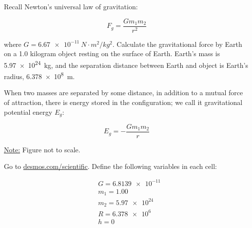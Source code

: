 \documentclass[../main-physics-problems.tex]{subfiles}
\begin{document}
\begin{questions}
\question
Recall Newton's universal law of gravitation:

\begin{equation*}
    F_g = \frac{G m_1 m_2}{r^2}
\end{equation*}

where $G = \SI{6.67e-11}{N\cdot m^2/kg^2}$. Calculate the gravitational force by Earth on a 1.0 kilogram object resting on the surface of Earth. Earth's mass is \SI{5.97e24}{kg}, and the separation distance between Earth and object is Earth's radius, \SI{6.378e8}{m}.

\question
When two masses are separated by some distance, in addition to a mutual force of attraction, there is energy stored in the configuration; we call it gravitational potential energy $E_g$:

\bigskip

\begin{minipage}{0.4\textwidth}
\Large 
\begin{equation*}
    E_g = -\frac{G m_1 m_2}{r}
\end{equation*}
\end{minipage}%
\begin{minipage}{0.4\textwidth}
\centering
{}

\underline{Note:} Figure not to scale.
\end{minipage}

\bigskip


Go to \href{https://www.desmos.com/scientific}{desmos.com/scientific}. Define the following variables in each cell:
\vspace{-1em}

\begin{align*}
    & G = \num{6.8139e-11} \\[1ex]
    & m_1 = 1.00 \\[1ex]
    & m_2 = \num{5.97e24} \\[1ex]
    & R = \num{6.378e6} \\[1ex]
    & h = 0 
\end{align*}


\end{questions}
\end{document}
